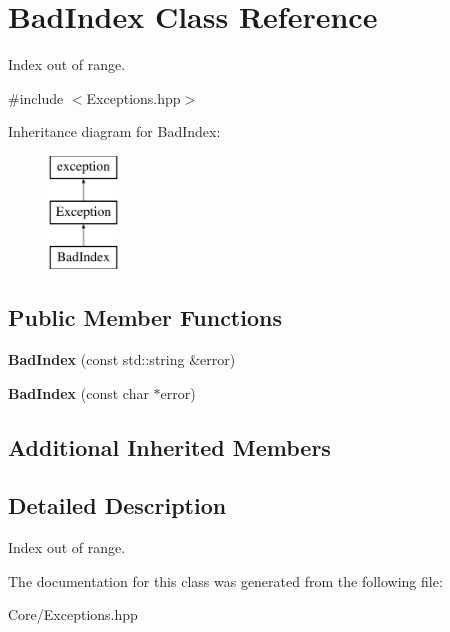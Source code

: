 \hypertarget{class_bad_index}{\section{Bad\-Index Class Reference}
\label{class_bad_index}
}


Index out of range.  




{\ttfamily \#include $<$Exceptions.\-hpp$>$}

Inheritance diagram for Bad\-Index\-:\begin{figure}[H]
\begin{center}
\leavevmode
\includegraphics[height=3.000000cm]{class_bad_index}
\end{center}
\end{figure}
\subsection*{Public Member Functions}
\begin{DoxyCompactItemize}
\item 
\hypertarget{class_bad_index_a88772de21dc1a2f4f7cd02c6e9e6c7da}{{\bfseries Bad\-Index} (const std\-::string \&error)}\label{class_bad_index_a88772de21dc1a2f4f7cd02c6e9e6c7da}

\item 
\hypertarget{class_bad_index_a0fea6f97b42a4663e7a162e4c08e556d}{{\bfseries Bad\-Index} (const char $\ast$error)}\label{class_bad_index_a0fea6f97b42a4663e7a162e4c08e556d}

\end{DoxyCompactItemize}
\subsection*{Additional Inherited Members}


\subsection{Detailed Description}
Index out of range. 

The documentation for this class was generated from the following file\-:\begin{DoxyCompactItemize}
\item 
Core/Exceptions.\-hpp\end{DoxyCompactItemize}
